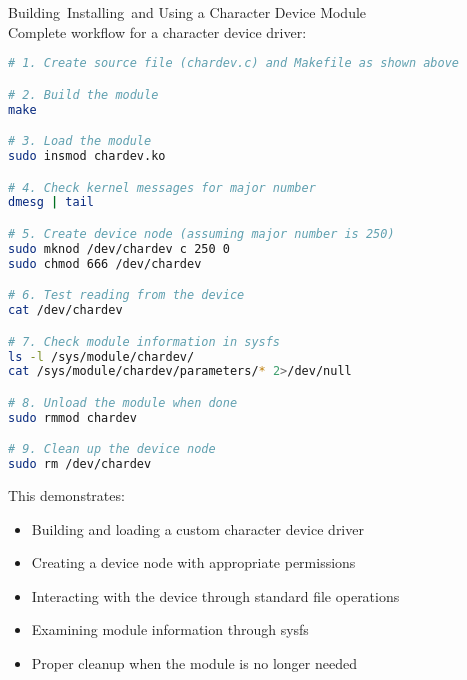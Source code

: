 \begin{example2}{Building\, Installing\, and Using a Character Device Module}\\
    Complete workflow for a character device driver:
    
\begin{lstlisting}[language=bash, style=basesmol]
# 1. Create source file (chardev.c) and Makefile as shown above

# 2. Build the module
make

# 3. Load the module
sudo insmod chardev.ko

# 4. Check kernel messages for major number
dmesg | tail

# 5. Create device node (assuming major number is 250)
sudo mknod /dev/chardev c 250 0
sudo chmod 666 /dev/chardev

# 6. Test reading from the device
cat /dev/chardev

# 7. Check module information in sysfs
ls -l /sys/module/chardev/
cat /sys/module/chardev/parameters/* 2>/dev/null

# 8. Unload the module when done
sudo rmmod chardev

# 9. Clean up the device node
sudo rm /dev/chardev
\end{lstlisting}

    This demonstrates:
    \begin{itemize}
        \item Building and loading a custom character device driver
        \item Creating a device node with appropriate permissions
        \item Interacting with the device through standard file operations
        \item Examining module information through sysfs
        \item Proper cleanup when the module is no longer needed
    \end{itemize}
\end{example2}

